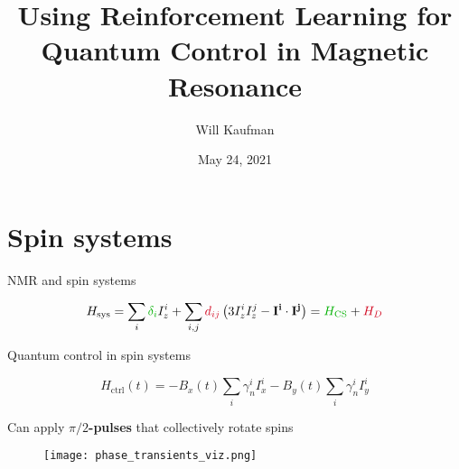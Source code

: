 \documentclass{beamer}
\title[RL for Quantum Control in NMR]{Using Reinforcement Learning for Quantum Control in Magnetic Resonance}
\author[Will Kaufman]{
Will Kaufman\inst{1}
}
\date[Spring 2021]{May 24, 2021 \\
}
\institute[Dartmouth College]{
\inst{1}Department of Physics and Astronomy, Dartmouth College \\
Hanover, NH 03755, USA
}
\begin{document}
\frame{\titlepage}


\section{Spin systems}


\begin{frame}{NMR and spin systems}

\begin{figure}
\centering
\scalebox{.7}{

}
\end{figure}

% 

\[
H_{\text{sys}} =\sum _{i}\textcolor[rgb]{0,0.69,0}{\delta_{i}} I^{i}_{z}
    + \sum _{i,j}\textcolor[rgb]{0.82,0.01,0.11}{d_{ij}}\left( 3I^{i}_{z} I^{j}_{z} -\mathbf{I^{i}} \cdot \mathbf{I^{j}}\right)
    = \textcolor[rgb]{0,0.69,0}{H_{\text{CS}}}
    + \textcolor[rgb]{0.82,0.01,0.11}{H_{D}}
\]



\end{frame}


\begin{frame}{Quantum control in spin systems}

\[
    H_{\text{ctrl}}(t) = -B_x(t) \sum_i \gamma_n^i I_x^i -B_y(t) \sum_i \gamma_n^i I_y^i
\]

Can apply \textbf{$\pi/2$-pulses} that collectively rotate spins

\begin{figure}
    \centering
    \scalebox{.5}{
    
    }
    \hspace{1em}
    \texttt{[image: phase\_transients\_viz.png]}
\end{figure}


\end{frame}
\end{document}
